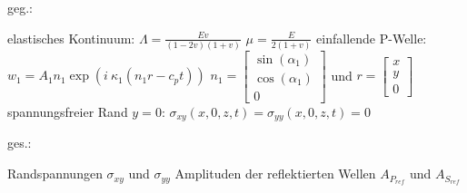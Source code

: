 \begin{minipage}[t]{\linewidth}
    geg.:
    \begin{tasks}
        \task[] elastisches Kontinuum:
        \task[] $\Lambda = \frac{E v}{(1-2v)(1+v)}$ \qquad $\mu = \frac{E}{2(1+v)}$ 
        \task[] einfallende P-Welle:
        \task[] $w_1 = A_1 n_1 \exp(i \ \kappa_1(n_1 r-c_p t))$ \qquad {} $n_1 = 
                \begin{bmatrix}
                    \sin(\alpha_1) \\
                    \cos(\alpha_1) \\
                    0
                \end{bmatrix}$ und $r = \begin{bmatrix}
                    x \\ y \\ 0
                \end{bmatrix}$
        \task[] spannungsfreier Rand $y = 0$:
        \task[] $\sigma_{xy} (x,0,z,t) = \sigma_{yy} (x,0,z,t) = 0$
    \end{tasks}
\end{minipage}
\quad
\begin{minipage}[t]{\linewidth}
    ges.:
    \begin{tasks}
        \task[] Randspannungen $\sigma_{xy}$ und $\sigma_{yy}$
        \task[] Amplituden der reflektierten Wellen $A_{P_{ref}}$ und $A_{S_{ref}}$
    \end{tasks}
\end{minipage}

